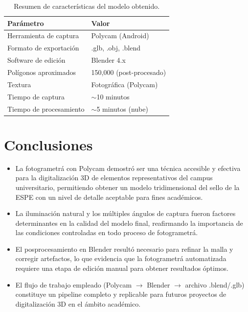 \documentclass[12pt,a4paper]{article}
\begin{document}
\begin{table}[H]
\centering
\caption{Resumen de caracter\'isticas del modelo obtenido.}
\vspace{0.3cm}
\begin{tabular}{|l|l|}
\hline
\textbf{Par\'ametro} & \textbf{Valor} \\ \hline
Herramienta de captura & Polycam (Android) \\ \hline
Formato de exportaci\'on & .glb, .obj, .blend \\ \hline
Software de edici\'on & Blender 4.x \\ \hline
Pol\'igonos aproximados & 150,000 (post-procesado) \\ \hline
Textura & Fotogr\'afica (Polycam) \\ \hline
Tiempo de captura & $\sim$10 minutos \\ \hline
Tiempo de procesamiento & $\sim$5 minutos (nube) \\ \hline
\end{tabular}
\end{table}

\section{Conclusiones}

\begin{itemize}
    \item La fotogrametr\'a con Polycam demostr\'o ser una t\'ecnica accesible y efectiva para la digitalizaci\'on 3D de elementos representativos del campus universitario, permitiendo obtener un modelo tridimensional del sello de la ESPE con un nivel de detalle aceptable para fines acad\'emicos.
    \item La iluminaci\'on natural y los m\'ultiples \'angulos de captura fueron factores determinantes en la calidad del modelo final, reafirmando la importancia de las condiciones controladas en todo proceso de fotogrametr\'a.
    \item El posprocesamiento en Blender result\'o necesario para refinar la malla y corregir artefactos, lo que evidencia que la fotogrametr\'a automatizada requiere una etapa de edici\'on manual para obtener resultados \'optimos.
    \item El flujo de trabajo empleado (Polycam $\rightarrow$ Blender $\rightarrow$ archivo .blend/.glb) constituye un pipeline completo y replicable para futuros proyectos de digitalizaci\'on 3D en el \'ambito acad\'emico.
\end{itemize}
\end{document}
